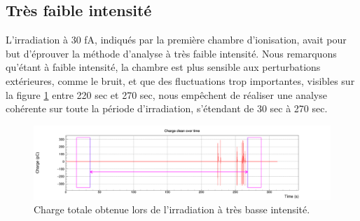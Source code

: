 \documentclass[a4paper,11pt]{article}
\begin{document}
\subsection*{Très faible intensité}
L'irradiation à 30 fA, indiqués par la première chambre d'ionisation, avait pour but d'éprouver la méthode d'analyse à très faible intensité.
Nous remarquons qu'étant à faible intensité, la chambre est plus sensible aux perturbations extérieures, comme le bruit, et que des fluctuations trop importantes, visibles sur la figure \ref{fig:bi} entre 220 sec et 270 sec, nous empêchent de réaliser une analyse cohérente sur toute la période d'irradiation, s'étendant de 30 sec à 270 sec.
\begin{figure}[h]
\begin{center}
\includegraphics[width=1.\linewidth]{Perturbations.png} 
\caption{\label{fig:bi}\footnotesize{Charge totale obtenue lors de l'irradiation à très basse intensité.}}
\end{center}
\end{figure}
\end{document}
